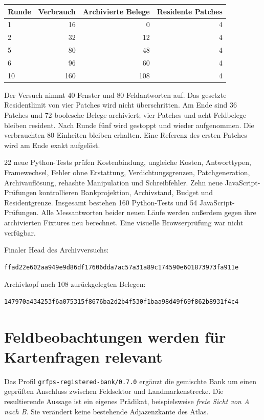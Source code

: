 \documentclass[11pt,a4paper]{article}
\newcommand{\nextsection}[2]{\clearpage{\color{accent}\small\textsf{#1}}\section{#2}}
\begin{document}
\begin{center}\begin{tabular}{@{}lrrr@{}}\toprule
Runde & Verbrauch & Archivierte Belege & Residente Patches\\\midrule
1 & 16 & 0 & 4\\
2 & 32 & 12 & 4\\
5 & 80 & 48 & 4\\
6 & 96 & 60 & 4\\
10 & 160 & 108 & 4\\\bottomrule
\end{tabular}\end{center}

Der Versuch nimmt 40 Fenster und 80 Feldantworten auf. Das gesetzte
Residentlimit von vier Patches wird nicht überschritten. Am Ende
sind 36 Patches und 72 boolesche Belege archiviert; vier Patches
und acht Feldbelege bleiben resident. Nach Runde fünf wird gestoppt
und wieder aufgenommen. Die verbrauchten 80 Einheiten bleiben erhalten.
Eine Referenz des ersten Patches wird am Ende exakt aufgelöst.

22 neue Python-Tests prüfen Kostenbindung, ungleiche Kosten,
Antworttypen, Framewechsel, Fehler ohne Erstattung, Verdichtungsgrenzen,
Patchgeneration, Archivauflösung, rehashte Manipulation und Schreibfehler.
Zehn neue JavaScript-Prüfungen kontrollieren Bankprojektion,
Archivstand, Budget und Residentgrenze. Insgesamt bestehen
160 Python-Tests und 54 JavaScript-Prüfungen. Alle Messantworten
beider neuen Läufe werden außerdem gegen ihre archivierten Fixtures
neu berechnet. Eine visuelle Browserprüfung war nicht verfügbar.

Finaler Head des Archivversuchs:
\begin{lstlisting}
ffad22e602aa949e9d86df17606dda7ac57a31a89c174590e601873973fa911e
\end{lstlisting}
Archivkopf nach 108 zurückgelegten Belegen:
\begin{lstlisting}
147970a434253f6a075315f8676ba2d2b4f530f1baa98d49f69f862b8931f4c4
\end{lstlisting}

\nextsection{42 / DOMÄNENANSCHLUSS}{Feldbeobachtungen werden für Kartenfragen relevant}
Das Profil \texttt{grfps-registered-bank/0.7.0} ergänzt die gemischte
Bank um einen geprüften Anschluss zwischen Feldsektor und
Landmarkenstrecke. Die resultierende Aussage ist ein eigenes Prädikat,
beispielsweise \emph{freie Sicht von A nach B}. Sie verändert keine
bestehende Adjazenzkante des Atlas.
\end{document}
